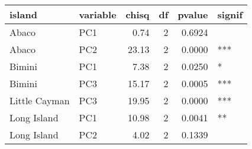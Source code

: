 
\begin{tabular}{llrrrl}
\toprule
island & variable & chisq & df & pvalue & signif\\
\midrule
Abaco & PC1 & 0.74 & 2 & 0.6924 & \\
Abaco & PC2 & 23.13 & 2 & 0.0000 & ***\\
Bimini & PC1 & 7.38 & 2 & 0.0250 & *\\
Bimini & PC3 & 15.17 & 2 & 0.0005 & ***\\
Little Cayman & PC3 & 19.95 & 2 & 0.0000 & ***\\
\addlinespace
Long Island & PC1 & 10.98 & 2 & 0.0041 & **\\
Long Island & PC2 & 4.02 & 2 & 0.1339 & \\
\bottomrule
\end{tabular}
